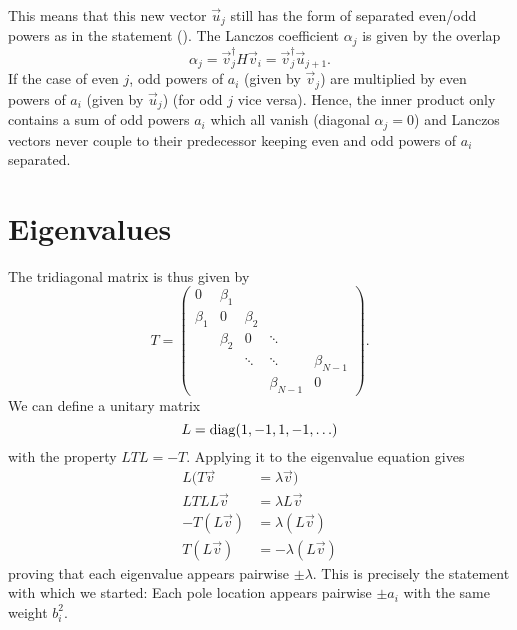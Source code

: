 This means that this new vector $\vec{u}_j$ still has the form of separated even/odd powers
as in the statement ().
The Lanczos coefficient $\alpha_j$ is given by the overlap
\begin{equation}
    \alpha_j
    =
    \vec{v}_j^\dagger H \vec{v}_i
    =
    \vec{v}_j^\dagger \vec{u}_{j+1}.
\end{equation}
If the case of even $j$, odd powers of $a_i$ (given by $\vec{v}_j$)
are multiplied by even powers of $a_i$ (given by $\vec{u}_j$)
(for odd $j$ vice versa).
Hence, the inner product only contains a sum of odd powers $a_i$ which all vanish
(diagonal $\alpha_j = 0$)
and Lanczos vectors never couple to their predecessor
keeping even and odd powers of $a_i$ separated.

\section{Eigenvalues}

The tridiagonal matrix is thus given by
\begin{equation}
    T
    =
    \begin{pmatrix}
        0       & \beta_1 &         &             &             \\
        \beta_1 & 0       & \beta_2 &             &             \\
                & \beta_2 & 0       & \ddots      &             \\
                &         & \ddots  & \ddots      & \beta_{N-1} \\
                &         &         & \beta_{N-1} & 0
    \end{pmatrix}.
\end{equation}
We can define a unitary matrix
\begin{equation}
    L = \operatorname{diag}(1, -1, 1, -1, \ldots)
\end{equation}
with the property $L T L = -T$.
Applying it to the eigenvalue equation gives
\begin{align}
    L(T \vec{v}   & = \lambda \vec{v})    \\
    LT LL\vec{v}  & = \lambda L\vec{v}    \\
    -T (L\vec{v}) & = \lambda (L\vec{v})  \\
    T (L\vec{v})  & = -\lambda (L\vec{v})
\end{align}
proving that each eigenvalue appears pairwise $\pm\lambda$.
This is precisely the statement with which we started:
Each pole location appears pairwise $\pm a_i$ with the same weight $b_i^2$.
